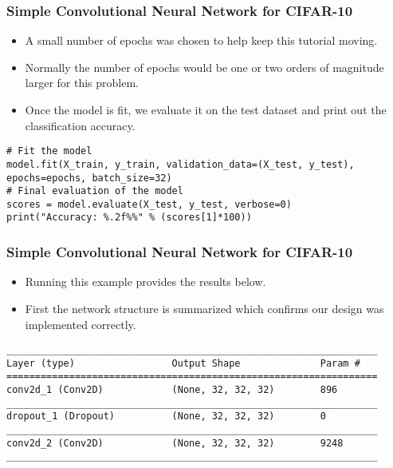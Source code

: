 \begin{frame}[fragile] \frametitle{Simple Convolutional Neural Network for CIFAR-10}

\begin{itemize}
\item A small number of epochs was chosen to help keep this tutorial moving. 
\item Normally the number of epochs would be one or two orders of magnitude larger for this problem.
\item Once the model is fit, we evaluate it on the test dataset and print out the classification accuracy.
\end{itemize}
\begin{lstlisting}
# Fit the model
model.fit(X_train, y_train, validation_data=(X_test, y_test), epochs=epochs, batch_size=32)
# Final evaluation of the model
scores = model.evaluate(X_test, y_test, verbose=0)
print("Accuracy: %.2f%%" % (scores[1]*100))
\end{lstlisting}
\end{frame}

\begin{frame}[fragile] \frametitle{Simple Convolutional Neural Network for CIFAR-10}

\begin{itemize}
\item Running this example provides the results below. 
\item First the network structure is summarized which confirms our design was implemented correctly.
\end{itemize}
\begin{lstlisting}
_________________________________________________________________
Layer (type)                 Output Shape              Param #  
=================================================================
conv2d_1 (Conv2D)            (None, 32, 32, 32)        896      
_________________________________________________________________
dropout_1 (Dropout)          (None, 32, 32, 32)        0        
_________________________________________________________________
conv2d_2 (Conv2D)            (None, 32, 32, 32)        9248      
_________________________________________________________________
\end{lstlisting}
\end{frame}

